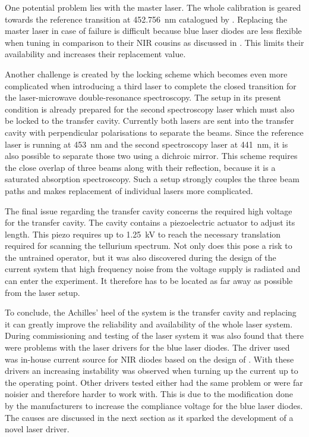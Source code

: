 One potential problem lies with the master laser. The whole calibration is geared towards the reference transition at \qty{452.756}{\nm} catalogued by \citeauthor{te_reference_lines} \cite{te_reference_lines}. Replacing the master laser in case of failure is difficult because blue laser diodes are less flexible when tuning in comparison to their NIR cousins as discussed in \cite{thesis_baus,thesis_alex}. This limits their availability and increases their replacement value.

Another challenge is created by the locking scheme which becomes even more complicated when introducing a third laser to complete the closed transition for the laser-microwave double-resonance spectroscopy. The setup in its present condition is already prepared for the second spectroscopy laser which must also be locked to the transfer cavity. Currently both lasers are sent into the transfer cavity with perpendicular polarisations to separate the beams. Since the reference laser is running at \qty{453}{\nm} and the second spectroscopy laser at \qty{441}{\nm}, it is also possible to separate those two using a dichroic mirror. This scheme requires the close overlap of three beams along with their reflection, because it is a saturated absorption spectroscopy. Such a setup strongly couples the three beam paths and makes replacement of individual lasers more complicated.

The final issue regarding the transfer cavity concerns the required high voltage for the transfer cavity. The cavity contains a piezoelectric actuator to adjust its length. This piezo requires up to \qty{1.25}{\kV} to reach the necessary translation required for scanning the tellurium spectrum. Not only does this pose a risk to the untrained operator, but it was also discovered during the design of the current system that high frequency noise from the voltage supply is radiated and can enter the experiment. It therefore has to be located as far away as possible from the laser setup.

To conclude, the Achilles' heel of the system is the transfer cavity and replacing it can greatly improve the reliability and availability of the whole laser system. During commissioning and testing  of the laser system it was also found that there were problems with the laser drivers for the blue laser diodes. The driver used was in-house current source for NIR diodes based on the design of \citeauthor{libbrecht_hall} \cite{libbrecht_hall}. With these drivers an increasing instability was observed when turning up the current up to the operating point. Other drivers tested either had the same problem or were far noisier and therefore harder to work with. This is due to the modification done by the manufacturers to increase the compliance voltage for the blue laser diodes. The causes are discussed in the next section as it sparked the development of a novel laser driver.

